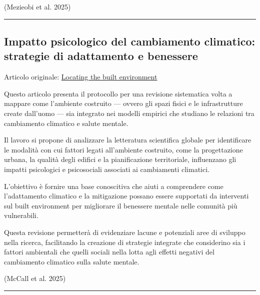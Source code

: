 \documentclass[
]{article}
\begin{document}
(Mezieobi et al. 2025)

\begin{center}\rule{0.5\linewidth}{0.5pt}\end{center}

\subsection{Impatto psicologico del cambiamento climatico: strategie di
adattamento e
benessere}\label{impatto-psicologico-del-cambiamento-climatico-strategie-di-adattamento-e-benessere}

Articolo originale:
\href{https://www.sciencedirect.com/science/article/pii/S1877343524000800}{Locating
the built environment}

Questo articolo presenta il protocollo per una revisione sistematica
volta a mappare come l'ambiente costruito --- ovvero gli spazi fisici e
le infrastrutture create dall'uomo --- sia integrato nei modelli
empirici che studiano le relazioni tra cambiamento climatico e salute
mentale.

Il lavoro si propone di analizzare la letteratura scientifica globale
per identificare le modalità con cui fattori legati all'ambiente
costruito, come la progettazione urbana, la qualità degli edifici e la
pianificazione territoriale, influenzano gli impatti psicologici e
psicosociali associati ai cambiamenti climatici.

L'obiettivo è fornire una base conoscitiva che aiuti a comprendere come
l'adattamento climatico e la mitigazione possano essere supportati da
interventi sul built environment per migliorare il benessere mentale
nelle comunità più vulnerabili.

Questa revisione permetterà di evidenziare lacune e potenziali aree di
sviluppo nella ricerca, facilitando la creazione di strategie integrate
che considerino sia i fattori ambientali che quelli sociali nella lotta
agli effetti negativi del cambiamento climatico sulla salute mentale.

(McCall et al. 2025)

\begin{center}\rule{0.5\linewidth}{0.5pt}\end{center}
\end{document}
